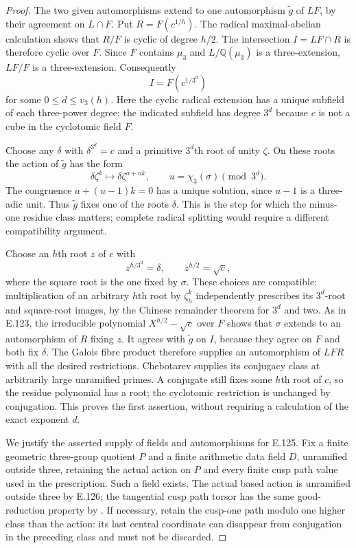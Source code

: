 \begin{proof}
The two given automorphisms extend to one automorphism
$\widetilde g$ of $LF$, by their agreement on $L\cap F$.
Put $R=F(c^{1/h})$. The radical maximal-abelian calculation
shows that $R/F$ is cyclic of degree $h/2$.
The intersection $I=LF\cap R$ is therefore cyclic over $F$.
Since $F$ contains $\mu_3$ and $L/\mathbb Q(\mu_3)$ is
a three-extension, $LF/F$ is a three-extension. Consequently
\[
             I=F(c^{1/3^d})
 \tag{E.128.2}
\]
for some $0\leq d\leq v_3(h)$. Here the cyclic radical
extension has a unique subfield of each three-power degree;
the indicated subfield has degree $3^d$ because $c$ is not
a cube in the cyclotomic field $F$.

Choose any $\delta$ with $\delta^{3^d}=c$ and a primitive
$3^d$th root of unity $\zeta$. On these roots the action of
$\widetilde g$ has the form
\[
 \delta\zeta^k\longmapsto\delta\zeta^{a+u k},
 \qquad u=\chi_3(\sigma)\pmod{3^d}.
\]
The congruence $a+(u-1)k=0$ has a unique solution, since
$u-1$ is a three-adic unit. Thus $\widetilde g$ fixes one
of the roots $\delta$. This is the step for which the
minus-one residue class matters; complete radical splitting
would require a different compatibility argument.

Choose an $h$th root $z$ of $c$ with
\[
 z^{h/3^d}=\delta,\qquad z^{h/2}=\sqrt c,
 \tag{E.128.3}
\]
where the square root is the one fixed by $\sigma$.
These choices are compatible: multiplication of an arbitrary
$h$th root by $\zeta_h^k$ independently prescribes its
$3^d$-root and square-root images, by the Chinese remainder
theorem for $3^d$ and two. As in E.123, the irreducible
polynomial $X^{h/2}-\sqrt c$ over $F$ shows that $\sigma$
extends to an automorphism of $R$ fixing $z$. It agrees with
$\widetilde g$ on $I$, because they agree on $F$ and both
fix $\delta$. The Galois fibre product therefore supplies
an automorphism of $LFR$ with all the desired restrictions.
Chebotarev supplies its conjugacy class at arbitrarily
large unramified primes. A conjugate still fixes some
$h$th root of $c$, so the residue polynomial has a root;
the cyclotomic restriction is unchanged by conjugation.
This proves the first assertion, without requiring a
calculation of the exact exponent $d$.

We justify the asserted supply of fields and automorphisms
for E.125. Fix a finite geometric three-group quotient $P$
and a finite arithmetic data field $D$, unramified outside
three, retaining the actual action on $P$ and every finite
cusp path value used in the prescription. Such a field
exists. The actual based action is unramified outside
three by E.126; the tangential cusp path torsor has the
same good-reduction property by
\citet[Definition 2.2 and Proposition 2.3, p.200]
{AuditWojtkowiak2007}. If necessary, retain the cusp-one
path modulo one higher class than the action: its last
central coordinate can disappear from conjugation in
the preceding class and must not be discarded.


\end{proof}
